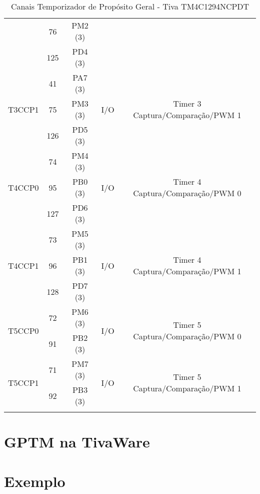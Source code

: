 \begin{center}
\begin{longtable}{|c|c|c|c|c|}
		& 76  & PM2 (3) &     &                                 \\ 
		& 125 & PD4 (3) &     &                                 \\ \hline
		\multirow{3}{*}{T3CCP1}    & 41  & PA7 (3) & \multirow{3}{*}{I/O} & \multirow{3}{*}{Timer 3 Captura/Comparação/PWM 1}\\
		& 75  & PM3 (3) &     &                                 \\ 
		& 126 & PD5 (3) &     &                                 \\ \hline
		\multirow{3}{*}{T4CCP0}    & 74  & PM4 (3) & \multirow{3}{*}{I/O} & \multirow{3}{*}{Timer 4 Captura/Comparação/PWM 0}\\
		& 95  & PB0 (3) &     &                                 \\ 
		& 127 & PD6 (3) &     &                                 \\ \hline
		\multirow{3}{*}{T4CCP1}    & 73  & PM5 (3) & \multirow{3}{*}{I/O} & \multirow{3}{*}{Timer 4 Captura/Comparação/PWM 1}\\
		& 96  & PB1 (3) &     &                                 \\ 
		& 128 & PD7 (3) &     &                                 \\ \hline
		\multirow{2}{*}{T5CCP0}    & 72  & PM6 (3) & \multirow{2}{*}{I/O} & \multirow{2}{*}{Timer 5 Captura/Comparação/PWM 0}\\
		& 91  & PB2 (3) &     &                                 \\ \hline
		\multirow{2}{*}{T5CCP1}    & 71  & PM7 (3) & \multirow{2}{*}{I/O} & \multirow{2}{*}{Timer 5 Captura/Comparação/PWM 1}\\
		& 92  & PB3 (3) &     &                                 \\ \hline
		\caption{Canais Temporizador de Propósito Geral - Tiva TM4C1294NCPDT \cite{DATASHEET_TIVA} }
		\label{tab:CanaisTimer}
	\end{longtable}
\end{center}

\section{GPTM na TivaWare}

\section{Exemplo}